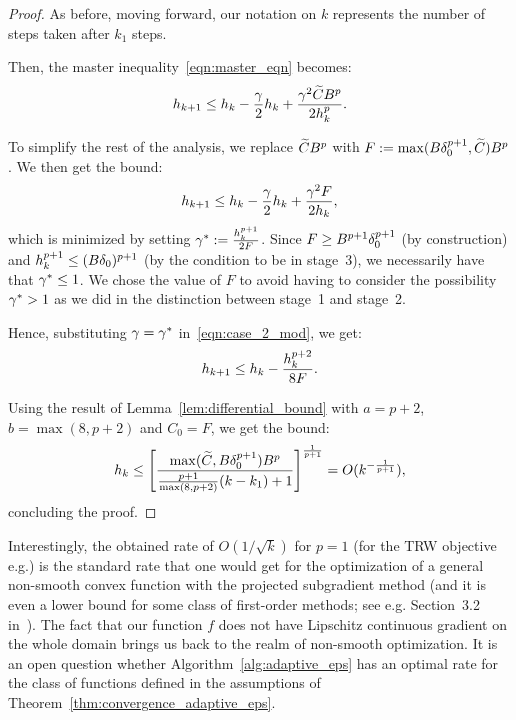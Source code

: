 \begin{proof}
	As before, moving forward, our notation on $k$ represents the number of steps taken after $k_1$ steps. 
	
	Then, the master inequality~\eqref{eqn:master_eqn} becomes: 
		$$h_{k+1}\leq h_k -\frac{\gamma}{2}h_k + \frac{\gamma^2\widetilde{C}B^p}{2h_k^p}.$$

	To simplify the rest of the analysis, we replace $\widetilde{C}B^p$ with $F := \max(B\delta_0^{p+1},\widetilde{C})B^p$. We then get the bound:
	\begin{equation}
		\label{eqn:case_2_mod}
		h_{k+1}\leq h_k-\frac{\gamma}{2}h_k + \frac{\gamma^2F}{2h_k},
	\end{equation}
	which is minimized by setting $\gamma^*:=\frac{h_k^{p+1}}{2F}$.  
	Since $F\geq B^{p+1}\delta_0^{p+1}$ (by construction) and $h_k^{p+1}\leq (B\delta_0)^{p+1}$ (by the condition to be in stage~3),
	we necessarily have that $\gamma^*\leq 1$. We chose the value of $F$ to avoid
	having to consider the possibility $\gamma^* > 1$ as we did in the distinction between stage~1 and stage~2.
	
	Hence, substituting $\gamma = \gamma^*$ in~\eqref{eqn:case_2_mod}, we get:
	$$h_{k+1}\leq h_k-\frac{h_k^{p+2}}{8F}.$$

	Using the result of Lemma~\ref{lem:differential_bound} with $a=p+2$, $b=\max(8,p+2)$ and $C_0 = F$, we get the bound:	
	$$h_k\leq\left[\frac{\max(\widetilde{C},B \delta_0^{p+1})B^p}{\frac{p+1}{\max(8,p+2)}(k-k_1)+1}\right]^{\frac{1}{p+1}} = O(k^{-\frac{1}{p+1}}),$$
	concluding the proof.
\end{proof}

Interestingly, the obtained rate of $O(1/\sqrt{k})$ for $p=1$ (for the TRW objective e.g.) is the standard rate that one would get for the optimization of a general non-smooth convex function with the projected subgradient method (and it is even a lower bound for some class of first-order methods; see e.g. Section~3.2 in~). The fact that our function $f$ does not have Lipschitz continuous gradient on the whole domain brings us back to the realm of non-smooth optimization. It is an open question whether Algorithm~\ref{alg:adaptive_eps} has an optimal rate for the class of functions defined in the assumptions of Theorem~\ref{thm:convergence_adaptive_eps}.


